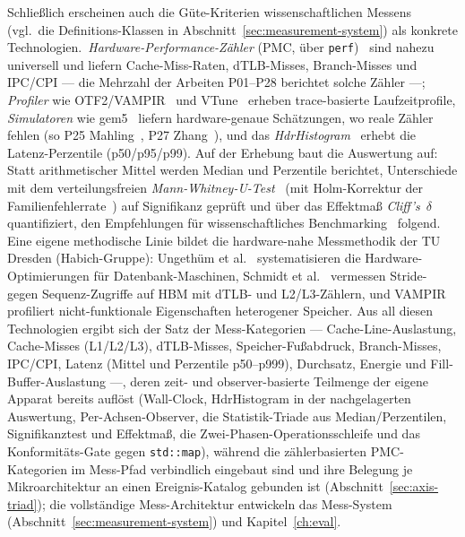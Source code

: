 \begin{nurlang}
Schließlich erscheinen auch die Güte-Kriterien wissenschaftlichen Messens (vgl.\ die Definitions-Klassen in Abschnitt~\ref{sec:measurement-system})
als konkrete Technologien.\ \emph{Hardware-Performance-Zähler} (PMC, über \texttt{perf})~\cite{demelo2010perf}
sind nahezu universell und liefern Cache-Miss-Raten, dTLB-Misses, Branch-Misses und IPC/CPI --- die
Mehrzahl der Arbeiten P01--P28 berichtet solche Zähler ---; \emph{Profiler}
wie OTF2/VAMPIR~\cite{berthold2023vampir} und VTune~\cite{reinders2005vtune} erheben trace-basierte
Laufzeitprofile, \emph{Simulatoren} wie gem5~\cite{binkert2011gem5} liefern hardware-genaue Schätzungen, wo
reale Zähler fehlen (so P25 Mahling~\cite{mahling2025hotpath}, P27
Zhang~\cite{zhang2025hierarchical}), und das \emph{HdrHistogram}~\cite{tene_hdrhistogram} erhebt die Latenz-Perzentile
(p50/p95/p99). Auf der Erhebung baut die Auswertung auf: Statt arithmetischer Mittel werden Median und
Perzentile berichtet, Unterschiede mit dem verteilungsfreien \emph{Mann-Whitney-U-Test}~\cite{mann1947utest}
(mit Holm-Korrektur der Familienfehlerrate~\cite{holm1979sequential}) auf Signifikanz geprüft und über das Effektmaß
\emph{Cliff's~$\delta$}~\cite{cliff1993dominance} quantifiziert, den Empfehlungen für wissenschaftliches
Benchmarking~\cite{hoefler2015benchmarking} folgend. Eine eigene methodische Linie bildet die hardware-nahe
Messmethodik der TU Dresden (Habich-Gruppe): Ungethüm et al.~\cite{ungethuem2017survey} systematisieren die
Hardware-Optimierungen für Datenbank-Maschinen, Schmidt et al.~\cite{schmidt2025hbm} vermessen Stride- gegen
Sequenz-Zugriffe auf HBM mit dTLB- und L2/L3-Zählern, und VAMPIR~\cite{berthold2023vampir} profiliert nicht-funktionale Eigenschaften
heterogener Speicher. Aus all diesen Technologien ergibt sich der Satz der Mess-Kategorien ---
Cache-Line-Auslastung, Cache-Misses (L1/L2/L3), dTLB-Misses, Speicher-Fußabdruck, Branch-Misses,
IPC/CPI, Latenz (Mittel und Perzentile p50--p999), Durchsatz, Energie und Fill-Buffer-Auslastung ---,
deren zeit- und observer-basierte Teilmenge der eigene Apparat bereits auflöst (Wall-Clock,
HdrHistogram in der nachgelagerten Auswertung, Per-Achsen-Observer, die Statistik-Triade aus
Median/Perzentilen, Signifikanztest und Effektmaß, die Zwei-Phasen-Operationsschleife und das
Konformitäts-Gate gegen \texttt{std::map}),
während die zählerbasierten PMC-Kategorien im Mess-Pfad verbindlich eingebaut sind und ihre Belegung je
Mikroarchitektur an einen Ereignis-Katalog gebunden ist (Abschnitt~\ref{sec:axis-triad}); die
vollständige Mess-Architektur entwickeln das Mess-System (Abschnitt~\ref{sec:measurement-system})
und Kapitel~\ref{ch:eval}.
\end{nurlang}
